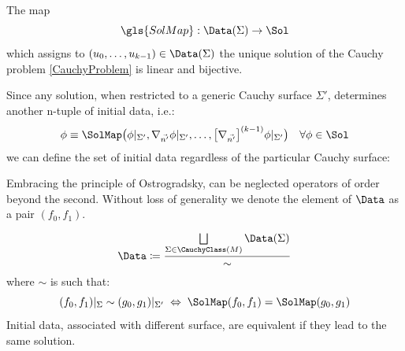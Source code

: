 \documentclass[Main]{subfiles}
\begin{document}
			\begin{proposition}
				The map $$ 	 \gls{SolMap} : \Data (\Sigma ) \rightarrow \Sol $$ which assigns to $(u_0, \ldots, u_{k-1})\in \Data(\Sigma)$ the unique solution of the Cauchy problem \ref{CauchyProblem} is linear and bijective.
			\end{proposition}
			
			Since any solution, when restricted to a generic Cauchy surface $\Sigma'$, determines another n-tuple of initial data, i.e.:
			\begin{displaymath}
				\phi \equiv \SolMap \big(\phi \vert_{\Sigma'}, \nabla_{\vec{n'}}\phi\vert_{\Sigma'}, \ldots, 
				\big[\nabla_{\vec{n'}}\big]^{(k-1)}\phi \vert_{\Sigma'} \big)	\quad \forall \phi\in \Sol
			\end{displaymath}						
			we can define the set of initial data regardless of the particular Cauchy surface:			

			\begin{NB}
			
				Embracing the principle of Ostrogradsky, can be neglected operators of order	beyond the second.
				Without loss of generality we denote the element of $\Data$ as a pair $(f_0,f_1)$.
			\end{NB}			
			
			\begin{definition}\label{Def:DataSenzaSup}
				\begin{displaymath}
					\Data  \coloneqq \frac{\bigsqcup\limits_{\Sigma \in \CauchyClass(M)}\Data(\Sigma)}{\sim} 
				\end{displaymath}
				where $\sim$ is such that:
				\begin{displaymath}
					(f_0, f_1)|_\Sigma \sim (g_0, g_1)|_{\Sigma'} \; \Leftrightarrow \; \SolMap(f_0,f_1) =  \SolMap(g_0,g_1) 
				\end{displaymath}
				\footnotesize{ Initial data, associated with different surface, are equivalent if they lead to the same solution.}	
			\end{definition}
			
\end{document}
